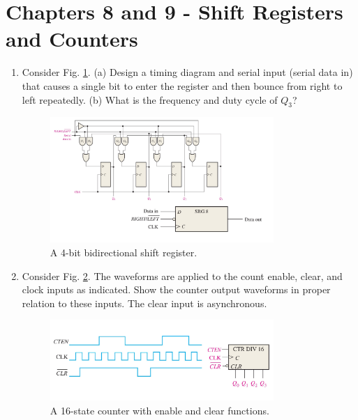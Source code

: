 \documentclass[10pt]{article}
\begin{document}
\clearpage

\section{Chapters 8 and 9 - Shift Registers and Counters}

\begin{enumerate}
\item Consider Fig. \ref{fig:sr1}.  (a) Design a timing diagram and serial input (serial data in) that causes a single bit to enter the register and then bounce from right to left repeatedly. (b) What is the frequency and duty cycle of $Q_3$?
\begin{figure}[ht]
\centering
\includegraphics[width=0.8\textwidth,trim=0cm 5cm 0cm 0cm,clip=true]{figures/shift_register1.pdf}
\caption{\label{fig:sr1} A 4-bit bidirectional shift register.}
\end{figure} \vspace{4cm}
\item Consider Fig. \ref{fig:count}.  The waveforms are applied to the count enable, clear, and clock inputs as indicated.  Show the counter output waveforms in proper relation to these inputs.  The clear input is asynchronous.
\begin{figure}[hb]
\centering
\includegraphics[width=0.8\textwidth]{figures/counter1.pdf}
\caption{\label{fig:count} A 16-state counter with enable and clear functions.}
\end{figure}
\end{enumerate}
\end{document}
